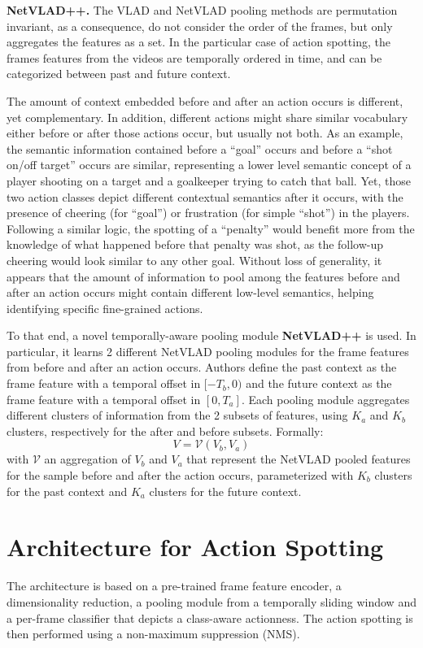 \documentclass{article}
\begin{document}
\textbf{NetVLAD++.} The VLAD and NetVLAD pooling methods are permutation invariant, as a consequence, do not consider the order of the frames, but only aggregates the features as a set. In the particular case of action spotting, the frames features from the videos are temporally ordered in time, and can be categorized between past and future context.

The amount of context embedded before and after an action occurs is different, yet complementary. In addition, different actions might share similar vocabulary either before or after those actions occur, but usually not both. As an example, the semantic information contained before a “goal” occurs and before a “shot on/off target” occurs are similar, representing a lower level semantic concept of a player shooting on a target and a goalkeeper trying to catch that ball. Yet, those two action classes depict different contextual semantics after it occurs, with the presence of cheering (for “goal”) or frustration (for simple “shot”) in the players. Following a similar logic, the spotting of a “penalty” would benefit more from the knowledge of what happened before that penalty was shot, as the follow-up cheering would look similar to any other goal. Without loss of generality, it appears that the amount of information to pool among the features before and after an action occurs might contain different low-level semantics, helping identifying specific fine-grained actions.

To that end, a novel temporally-aware pooling module \textbf{NetVLAD++} is used. In particular, it learns 2 different NetVLAD pooling modules for the frame features from before and after an action occurs. Authors define the past context as the frame feature with a temporal offset in $[-T_b, 0)$ and the future context as the frame feature with a temporal offset in $[0, T_a]$. Each pooling module aggregates different clusters of information from the 2 subsets of features, using $K_a$ and $K_b$ clusters, respectively for the after and before subsets. Formally:
\begin{equation}
    V = \mathcal{V}(V_b, V_a)
\end{equation}
with $\mathcal{V}$  an aggregation of $V_b$ and $V_a$ that represent the NetVLAD pooled features for the sample before and after the action occurs, parameterized with $K_b$ clusters for the past context and $K_a$ clusters for the future context.

\section{Architecture for Action Spotting}
The architecture is based on a pre-trained frame feature encoder, a dimensionality reduction, a pooling module from a temporally sliding window and a per-frame classifier that depicts a class-aware actionness. The action spotting is then performed using a non-maximum suppression (NMS). 
\end{document}
